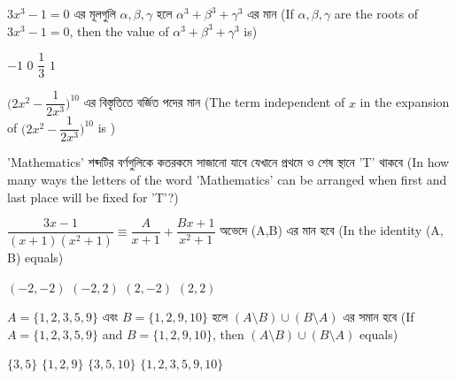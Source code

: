 \documentclass[addpoints]{exam}
\begin{document}
\begin{questions}
\begin{oneparchoices}

\end{oneparchoices}

\question   $ 3x^3 -1=0 $  এর মূলগুলি $ \alpha, \beta, \gamma $ হলে $ \alpha^{3} + \beta^{3} + \gamma^{3} $ এর মান (If $ \alpha, \beta, \gamma $ are the roots of $ 3x^3 -1=0 $, then the value of $ \alpha^{3} + \beta^{3} + \gamma^{3} $ is)

\begin{oneparchoices}
\choice $ -1 $
\choice $ 0 $
\choice $ \dfrac{1}{3} $
\choice  $ 1 $

\end{oneparchoices}

\question   $ \Bigg( 2x^2 -\dfrac{1}{2x^3}\Bigg)^{10} $   এর বিস্তৃতিতে বর্জিত পদের মান (The term independent of $ x $ in the expansion of $ \Bigg( 2x^2 -\dfrac{1}{2x^3}\Bigg)^{10} $ is )

\begin{oneparchoices}

\end{oneparchoices}

\question    'Mathematics' শব্দটির বর্ণগুলিকে কতরকমে সাজানো যাবে যেখানে প্রথমে ও শেষ স্থানে 'T' থাকবে (In how many ways the letters of the word 'Mathematics' can be arranged when first and last place will be fixed for 'T'?)

\begin{oneparchoices}

\end{oneparchoices}

\question  $ \dfrac{3x-1}{(x+1)(x^2 +1)} \equiv \dfrac{A}{x+1} + \dfrac{Bx+1}{x^2 +1} $  অভেদে (A,B) এর মান হবে (In the identity (A, B) equals)

\begin{oneparchoices}
\choice $ (-2,-2) $
\choice $ (-2, 2) $
\choice $ (2,-2) $
\choice  $ (2,2) $

\end{oneparchoices}

\question    $ A= \{1,2,3,5,9\} $ এবং $ B= \{1,2,9, 10\} $ হলে $ (A\setminus B)\cup (B\setminus A) $ এর সমান হবে (If $ A= \{1,2,3,5,9\} $ and $ B= \{1,2,9, 10\} $, then $ (A\setminus B)\cup (B\setminus A) $ equals)

\begin{oneparchoices}
\choice $ \{3,5\} $
\choice $ \{1,2,9\} $
\choice $ \{3,5, 10\} $
\choice  $ \{1,2,3,5,9,10\} $


\end{oneparchoices}
\end{questions}
\end{document}
